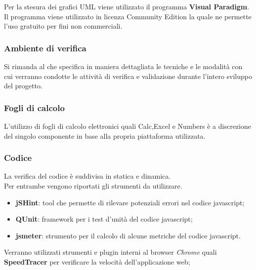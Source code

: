 Per la stesura dei grafici UML viene utilizzato il programma \textbf{Visual Paradigm}. Il programma viene utilizzato in licenza Community Edition la quale ne permette l’uso gratuito per fini non commerciali.



\subsubsection{Ambiente di verifica}

Si rimanda al \href{run:../../Esterni/\fPianoDiQualifica}{\fEscapePianoDiQualifica} che specifica in maniera dettagliata
le tecniche e le modalità con cui verranno condotte le attività di verifica e validazione durante l’intero sviluppo del progetto.

\subsubsection{Fogli di calcolo}
L'utilizzo di fogli di calcolo elettronici quali Calc,Excel e Numbers è a discrezione del singolo componente in base alla propria piattaforma utilizzata.


\subsubsection{Codice} 

La verifica del codice è suddivisa in statica e dinamica.\\ 
Per entrambe vengono riportati gli strumenti da utilizzare. 


  \begin{itemize}
  \item \textbf{jSHint}: tool che permette di rilevare potenziali errori nel codice javascript;
  \item \textbf{QUnit}: framework per i test d'unità del codice javascript;
  \item \textbf{jsmeter}: strumento per il calcolo di alcune metriche del codice javascript.
  \end{itemize}

Verranno utilizzati strumenti e plugin interni al browser \emph{Chrome} quali \textbf{SpeedTracer} per verificare la velocità dell'applicazione web;



